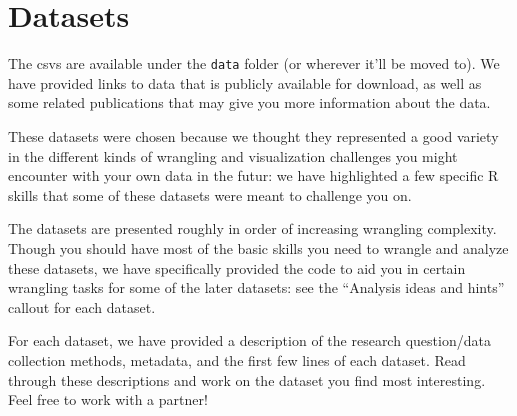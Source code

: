 \documentclass[
  letterpaper,
  DIV=11,
  numbers=noendperiod]{scrreprt}
\begin{document}
\hypertarget{datasets}{%
\section{Datasets}\label{datasets}}

The csvs are available under the \texttt{data} folder (or wherever it'll
be moved to). We have provided links to data that is publicly available
for download, as well as some related publications that may give you
more information about the data.

These datasets were chosen because we thought they represented a good
variety in the different kinds of wrangling and visualization challenges
you might encounter with your own data in the futur: we have highlighted
a few specific R skills that some of these datasets were meant to
challenge you on.

\begin{tcolorbox}[enhanced jigsaw, left=2mm, colframe=quarto-callout-note-color-frame, leftrule=.75mm, opacitybacktitle=0.6, toptitle=1mm, title=\textcolor{quarto-callout-note-color}{\faInfo}\hspace{0.5em}{Note}, opacityback=0, coltitle=black, colbacktitle=quarto-callout-note-color!10!white, breakable, colback=white, titlerule=0mm, bottomrule=.15mm, arc=.35mm, bottomtitle=1mm, rightrule=.15mm, toprule=.15mm]

The datasets are presented roughly in order of increasing wrangling
complexity. Though you should have most of the basic skills you need to
wrangle and analyze these datasets, we have specifically provided the
code to aid you in certain wrangling tasks for some of the later
datasets: see the ``Analysis ideas and hints'' callout for each dataset.

\end{tcolorbox}

For each dataset, we have provided a description of the research
question/data collection methods, metadata, and the first few lines of
each dataset. Read through these descriptions and work on the dataset
you find most interesting. Feel free to work with a partner!
\end{document}
